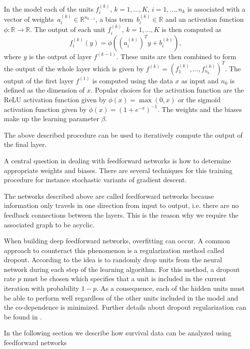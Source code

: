 \documentclass[12pt, a4paper]{scrartcl}
\theoremstyle{definition}
\theoremstyle{plain}
\numberwithin{equation}{section}
\numberwithin{figure}{section}
\numberwithin{table}{section}
\begin{document}
	In the model each of the units $f^{(k)}_i$, $k=1,\dots,K$, $i = 1,\dots,n_{k}$ is associated with a vector of weights~$a^{(k)}_i \in \mathbb{R}^{n_{k-1}}$, a bias term~$b^{(k)}_i\in \mathbb{R}$ and an activation function~$\phi: \mathbb{R} \to \mathbb{R}$.
	The output of each unit $f^{(k)}_i$, $k=1,\dots,K$ is then computed as
	\begin{equation*}
	f_i^{(k)}(y) = \phi \left(\left(a^{(k)}_i\right)^Ty + b^{(k)}_i\right),
	\end{equation*}
	where $y$ is the output of layer $f^{(k-1)}$.
	These units are then combined to form the output of the whole layer which is given by $f^{(k)} = \left(f^{(k)}_1,\dots, f^{(k)}_{n_k}\right)^T$.
	The output of the first layer $f^{(1)}$ is computed using the data $x$ as input and $n_0$ is defined as the dimension of $x$.
	Popular choices for the activation function are the ReLU activation function given by $\phi(x) = \max(0,x)$ or the sigmoid activation function given by $\phi(x) = (1+e^{-x})^{-1}$.
	The weights and the biases make up the learning parameter $\beta$.
	
	The above described procedure can be used to iteratively compute the output of the final layer.
	
	A central question in dealing with feedforward networks is how to determine appropriate weights and biases.
	There are several techniques for this training procedure for instance stochastic variants of gradient descent.
	
	The networks described above are called feedforward networks because information only travels in one direction from input to output, i.e. there are no feedback connections between the layers.
	This is the reason why we require the associated graph to be acyclic.
	
	When building deep feedforward networks, overfitting can occur.
	A common approach to counteract this phenomenon is a regularization method called dropout.
	According to \citet*{dropout} the idea is to randomly drop units from the neural network during each step of the learning algorithm.
	For this method, a dropout rate $p$ must be chosen which specifies that a unit is included in the current iteration with probability $1-p$.
	As a consequence, each of the hidden units must be able to perform well regardless of the other units included in the model and the co-dependence is minimized.
	Further details about dropout regularization can be found in \citet*{dropout}.
	
	In the following section we describe how survival data can be analyzed using feedforward networks
	
\end{document}
